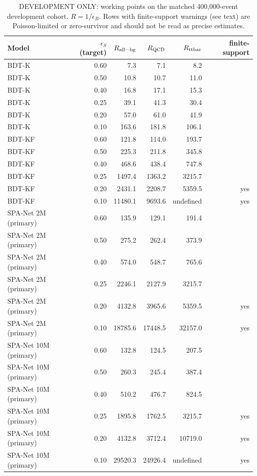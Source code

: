\begin{table}[htbp]
\centering
\caption{DEVELOPMENT ONLY: working points on the matched 400{,}000-event development cohort. $R=1/\epsilon_B$. Rows with finite-support warnings (see text) are Poisson-limited or zero-survivor and should not be read as precise estimates.}
\begin{tabular}{lrrrrr}
\hline
Model & $\epsilon_S$ (target) & $R_{\rm all-bg}$ & $R_{\rm QCD}$ & $R_{\rm ttbar}$ & finite-support \\
\hline
BDT-K & 0.60 & 7.3 & 7.1 & 8.2 &  \\
BDT-K & 0.50 & 10.8 & 10.7 & 11.0 &  \\
BDT-K & 0.40 & 16.8 & 17.1 & 15.3 &  \\
BDT-K & 0.25 & 39.1 & 41.3 & 30.4 &  \\
BDT-K & 0.20 & 57.0 & 61.0 & 41.9 &  \\
BDT-K & 0.10 & 163.6 & 181.8 & 106.1 &  \\
BDT-KF & 0.60 & 121.8 & 114.0 & 193.7 &  \\
BDT-KF & 0.50 & 225.3 & 211.8 & 345.8 &  \\
BDT-KF & 0.40 & 468.6 & 438.4 & 747.8 &  \\
BDT-KF & 0.25 & 1497.4 & 1363.2 & 3215.7 &  \\
BDT-KF & 0.20 & 2431.1 & 2208.7 & 5359.5 & yes \\
BDT-KF & 0.10 & 11480.1 & 9693.6 & undefined & yes \\
SPA-Net 2M (primary) & 0.60 & 135.9 & 129.1 & 191.4 &  \\
SPA-Net 2M (primary) & 0.50 & 275.2 & 262.4 & 373.9 &  \\
SPA-Net 2M (primary) & 0.40 & 574.0 & 548.7 & 765.6 &  \\
SPA-Net 2M (primary) & 0.25 & 2246.1 & 2127.9 & 3215.7 &  \\
SPA-Net 2M (primary) & 0.20 & 4132.8 & 3965.6 & 5359.5 & yes \\
SPA-Net 2M (primary) & 0.10 & 18785.6 & 17448.5 & 32157.0 & yes \\
SPA-Net 10M (primary) & 0.60 & 132.8 & 124.5 & 207.5 &  \\
SPA-Net 10M (primary) & 0.50 & 260.3 & 245.4 & 387.4 &  \\
SPA-Net 10M (primary) & 0.40 & 510.2 & 476.7 & 824.5 &  \\
SPA-Net 10M (primary) & 0.25 & 1895.8 & 1762.5 & 3215.7 & yes \\
SPA-Net 10M (primary) & 0.20 & 4132.8 & 3712.4 & 10719.0 & yes \\
SPA-Net 10M (primary) & 0.10 & 29520.3 & 24926.4 & undefined & yes \\
\hline
\end{tabular}
\end{table}
